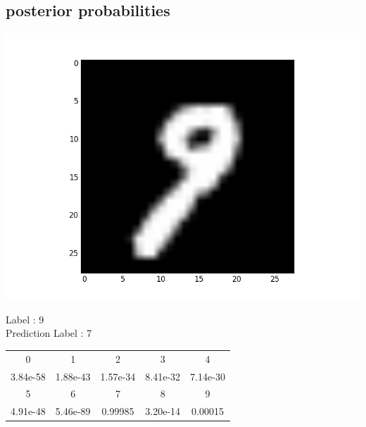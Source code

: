 \documentclass{article}
\begin{document}
\subsection{posterior probabilities}
\noindent\begin{minipage}{0.5\textwidth}
	\includegraphics[width=\linewidth]{hw3_f0}
\end{minipage}%
\hfill%
\begin{minipage}{0.5\textwidth}
	Label : 9\\
	Prediction Label : 7\\
	\begin{tabular}{ | c | c | c | c | c | }
		\hline
		0 & 1 & 2 & 3 & 4 \\		
3.84e-58 &
1.88e-43 &
1.57e-34 &
8.41e-32 &
7.14e-30 \\
		\hline
		5 & 6 & 7 & 8 & 9 \\
4.91e-48 &
5.46e-89 &
0.99985 &
3.20e-14 &
0.00015 \\
		\hline
	\end{tabular}\\
\end{minipage}
\end{document}
